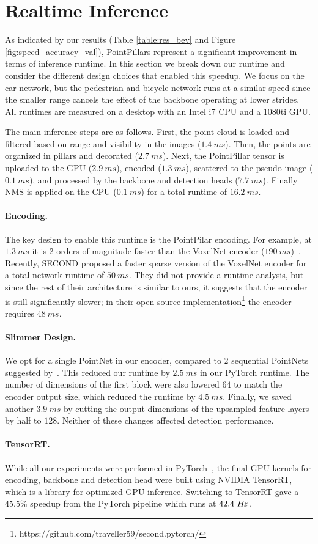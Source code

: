 \documentclass[10pt,twocolumn,letterpaper]{article}
\newcommand{\mypar}[1]{\vspace{-4mm}\paragraph{#1}}
\newcommand{\figref}[1]{Figure \ref{#1}}
\newcommand{\tableref}[1]{Table \ref{#1}}
\newcommand{\squeeze}{\vspace{-0.5mm}}
\begin{document}
 


\section{Realtime Inference} \label{sec:runtime}
\squeeze
As indicated by our results (\tableref{table:res_bev} and \figref{fig:speed_accuracy_val}), PointPillars represent a significant improvement in terms of inference runtime.
In this section we break down our runtime and consider the different design choices that enabled this speedup.
We focus on the car network, but the pedestrian and bicycle network runs at a similar speed since the smaller range cancels the effect of the backbone operating at lower strides.
All runtimes are measured on a desktop with an Intel i7 CPU and a 1080ti GPU.

The main inference steps are as follows.
First, the point cloud is loaded and filtered based on range and visibility in the images ($1.4~ms$).
Then, the points are organized in pillars and decorated ($2.7~ms$).
Next, the PointPillar tensor is uploaded to the GPU ($2.9~ms$), encoded ($1.3~ms$), scattered to the pseudo-image ($0.1~ms$), and processed by the backbone and detection heads ($7.7~ms$).
Finally NMS is applied on the CPU ($0.1~ms$) for a total runtime of $16.2~ms$.

\mypar{Encoding.}
The key design to enable this runtime is the PointPilar encoding.
For example, at $1.3~ms$ it is 2 orders of magnitude faster than the VoxelNet encoder ($190~ms$)~\cite{voxelnet}.
Recently, SECOND proposed a faster sparse version of the VoxelNet encoder for a total network runtime of $50~ms$.
They did not provide a runtime analysis, but since the rest of their architecture is similar to ours, it suggests that the encoder is still significantly slower; in their open source implementation\footnote{https://github.com/traveller59/second.pytorch/} the encoder requires $48~ms$.

\mypar{Slimmer Design.}
We opt for a single PointNet in our encoder, compared to 2 sequential PointNets suggested by~\cite{voxelnet}.
This reduced our runtime by $2.5~ms$ in our PyTorch runtime.
The number of dimensions of the first block were also lowered $64$ to match the encoder output size, which reduced the runtime by $4.5~ms$.
Finally, we saved another $3.9~ms$ by cutting the output dimensions of the upsampled feature layers by half to $128$.
Neither of these changes affected detection performance.

\mypar{TensorRT.}
While all our experiments were performed in PyTorch~\cite{pytorch}, the final GPU kernels for encoding, backbone and detection head were built using NVIDIA TensorRT, which is a library for optimized GPU inference. 
Switching to TensorRT gave a $45.5\%$ speedup from the PyTorch pipeline which runs at $42.4~H\hspace{-.5mm}z$.
\end{document}
